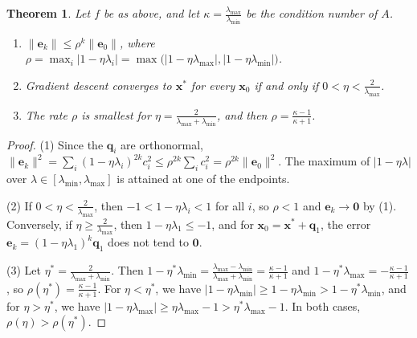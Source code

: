 \documentclass[11pt]{article}
\newcommand{\norm}[1]{\lVert #1 \rVert}
\theoremstyle{definition}
\theoremstyle{plain}
\newtheorem{theorem}[definition]{Theorem}
\theoremstyle{remark}
\begin{document}
\begin{theorem}\label{thm:gd-quadratic}
    Let $f$ be as above, and let $\kappa = \frac{\lambda_{\max}}{\lambda_{\min}}$ be the condition number of $A$.
    \begin{enumerate}
        \item $\norm{\mathbf{e}_k} \leq \rho^k \norm{\mathbf{e}_0}$, where $\rho = \max_i |1 - \eta\lambda_i| = \max\big(|1 - \eta\lambda_{\max}|, |1 - \eta\lambda_{\min}|\big)$.
        \item Gradient descent converges to $\mathbf{x}^*$ for every $\mathbf{x}_0$ if and only if $0 < \eta < \frac{2}{\lambda_{\max}}$.
        \item The rate $\rho$ is smallest for $\eta = \frac{2}{\lambda_{\max} + \lambda_{\min}}$, and then $\rho = \frac{\kappa - 1}{\kappa + 1}$.
    \end{enumerate}
\end{theorem}

\begin{proof}
    (1) Since the $\mathbf{q}_i$ are orthonormal, $\norm{\mathbf{e}_k}^2 = \sum_i (1 - \eta\lambda_i)^{2k} c_i^2 \leq \rho^{2k}\sum_i c_i^2 = \rho^{2k}\norm{\mathbf{e}_0}^2$. The maximum of $|1 - \eta\lambda|$ over $\lambda \in [\lambda_{\min}, \lambda_{\max}]$ is attained at one of the endpoints.

    (2) If $0 < \eta < \frac{2}{\lambda_{\max}}$, then $-1 < 1 - \eta\lambda_i < 1$ for all $i$, so $\rho < 1$ and $\mathbf{e}_k \to \mathbf{0}$ by (1). Conversely, if $\eta \geq \frac{2}{\lambda_{\max}}$, then $1 - \eta\lambda_1 \leq -1$, and for $\mathbf{x}_0 = \mathbf{x}^* + \mathbf{q}_1$, the error $\mathbf{e}_k = (1 - \eta\lambda_1)^k\mathbf{q}_1$ does not tend to $\mathbf{0}$.

    (3) Let $\eta^* = \frac{2}{\lambda_{\max} + \lambda_{\min}}$. Then $1 - \eta^*\lambda_{\min} = \frac{\lambda_{\max} - \lambda_{\min}}{\lambda_{\max} + \lambda_{\min}} = \frac{\kappa - 1}{\kappa + 1}$ and $1 - \eta^*\lambda_{\max} = -\frac{\kappa - 1}{\kappa + 1}$, so $\rho(\eta^*) = \frac{\kappa - 1}{\kappa + 1}$. For $\eta < \eta^*$, we have $|1 - \eta\lambda_{\min}| \geq 1 - \eta\lambda_{\min} > 1 - \eta^*\lambda_{\min}$, and for $\eta > \eta^*$, we have $|1 - \eta\lambda_{\max}| \geq \eta\lambda_{\max} - 1 > \eta^*\lambda_{\max} - 1$. In both cases, $\rho(\eta) > \rho(\eta^*)$.
\end{proof}
\end{document}
